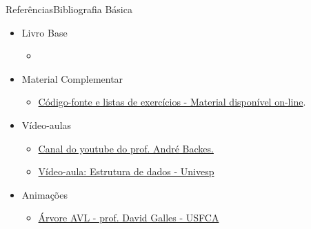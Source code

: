 \documentclass[aspectratio=169]{beamer}
\begin{document}

\begin{frame}{Referências}{Bibliografia Básica}
\begin{itemize}
\item Livro Base
\begin{itemize}
\item 

\end{itemize}
\item Material Complementar
\begin{itemize}
\item \href{https://programacaodescomplicada.wordpress.com/complementar/}{Código-fonte e listas de exercícios - Material disponível on-line}.
\end{itemize}
\item Vídeo-aulas
\begin{itemize}
\item \href{https://www.youtube.com/watch?v=Au-6c55J90c&index=78&list=PL8iN9FQ7_jt6H5m4Gm0H89sybzR9yaaka}{Canal do youtube do prof. André Backes.}
\item \href{https://www.youtube.com/watch?v=YkF76cOgtMQ&t=92s}{Vídeo-aula: Estrutura de dados - Univesp}
\end{itemize}
\item Animações
\begin{itemize}
\item \href{https://www.cs.usfca.edu/~galles/visualization/AVLtree.html}{Árvore AVL - prof. David Galles - USFCA}
\end{itemize}
\end{itemize}
\end{frame}

\end{document}
